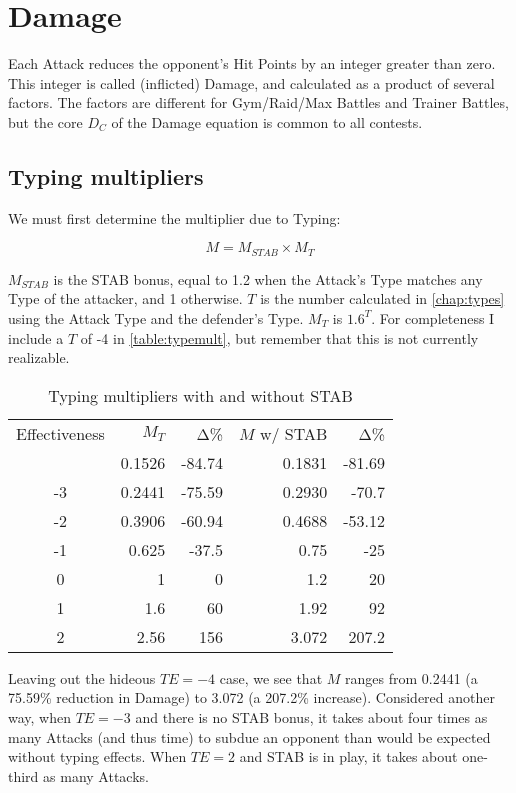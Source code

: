 \chapter{Damage}
\label{chap:damage}
Each Attack reduces the opponent's Hit Points by an integer greater than zero.
This integer is called (inflicted) Damage, and calculated as a product of several factors.
The factors are different for Gym/Raid/Max Battles and Trainer Battles,
 but the core $D_C$ of the Damage equation is common to all contests.

\section{Typing multipliers}
We must first determine the multiplier due to Typing:

\[ M = M_{STAB} \times M_{T} \]

$M_{STAB}$ is the STAB bonus, equal to 1.2 when the Attack's Type matches any
  Type of the attacker, and 1 otherwise.
$T$ is the number calculated in \autoref{chap:types} using the Attack Type
 and the defender's Type.
$M_{T}$ is $1.6^{T}$.
For completeness I include a $T$ of -4 in \autoref{table:typemult},
 but remember that this is not currently realizable.

\begin{table}
\begin{center}
\begin{tabular}{c r r r r}
  Effectiveness & $M_{T}$ & Δ\% & $M$ w/ STAB & Δ\% \\
\Midrule
  -4 & 0.1526 & -84.74 & 0.1831 & -81.69 \\
  -3 & 0.2441 & -75.59 & 0.2930 & -70.7 \\
  -2 & 0.3906 & -60.94 & 0.4688 & -53.12 \\
  -1 & 0.625 & -37.5 & 0.75 & -25 \\
  0 & 1 & 0 & 1.2 & 20 \\
  1 & 1.6 & 60 & 1.92 & 92 \\
  2 & 2.56 & 156 & 3.072 & 207.2 \\
\end{tabular}
\caption{Typing multipliers with and without STAB}
\label{table:typemult}
\end{center}
\end{table}

Leaving out the hideous $TE = -4$ case, we see that $M$ ranges
 from 0.2441 (a 75.59\% reduction in Damage) to 3.072
 (a 207.2\% increase).
Considered another way, when $TE = -3$ and there is no STAB bonus,
 it takes about four times as many Attacks (and thus time) to subdue
 an opponent than would be expected without typing effects.
When $TE = 2$ and STAB is in play, it takes about one-third as many Attacks.


